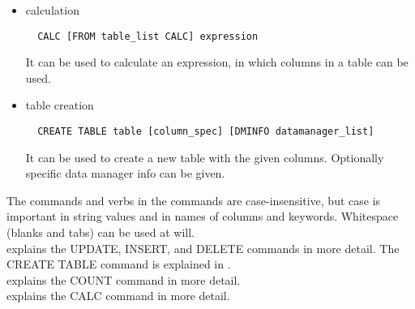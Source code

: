 \begin{itemize}
\item calculation
\begin{verbatim}
  CALC [FROM table_list CALC] expression
\end{verbatim}
It can be used to calculate an expression, in which columns
in a table can be used.

\item table creation
\begin{verbatim}
  CREATE TABLE table [column_spec] [DMINFO datamanager_list]
\end{verbatim}
It can be used to create a new table with the given columns.
Optionally specific data manager info can be given.

\end{itemize}
The commands and verbs in the commands are
case-insensitive, but case is important in string values and
in names of columns and keywords. Whitespace (blanks and tabs) can
be used at will.
\\ explains the
UPDATE, INSERT, and DELETE commands in more detail. The CREATE TABLE command is
explained in .
\\
explains the COUNT command in more detail.
\\
explains the CALC command in more detail.


